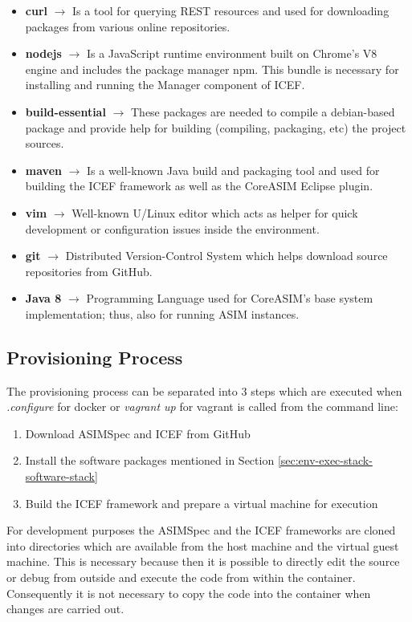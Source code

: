 \begin{itemize}
	\item \textbf{curl} $\rightarrow$ Is a tool for querying REST resources and used for downloading packages from various online repositories.
	\item \textbf{nodejs} $\rightarrow$ Is a JavaScript runtime environment built on Chrome's V8 engine and includes the package manager npm. This bundle is necessary for installing and running the Manager component of ICEF.
	\item \textbf{build-essential} $\rightarrow$ These packages are needed to compile a debian-based package and provide help for building (compiling, packaging, etc) the project sources.
	\item \textbf{maven} $\rightarrow$ Is a well-known Java build and packaging tool and used for building the ICEF framework as well as the CoreASIM Eclipse plugin.
	\item \textbf{vim} $\rightarrow$ Well-known U/Linux editor which acts as helper for quick development or configuration issues inside the environment.
	\item \textbf{git} $\rightarrow$ Distributed Version-Control System which helps download source repositories from GitHub.
	\item \textbf{Java 8} $\rightarrow$ Programming Language used for CoreASIM's base system implementation; thus, also for running ASIM instances.
\end{itemize}

\subsection{Provisioning Process}

The provisioning process can be separated into 3 steps which are executed when \textit{.\/configure} for docker or \textit{vagrant up} for vagrant is called from the command line:

\begin{enumerate}
	\item Download ASIMSpec and ICEF from GitHub
	\item Install the software packages mentioned in Section \ref{sec:env-exec-stack-software-stack}
	\item Build the ICEF framework and prepare a virtual machine for execution
\end{enumerate}

For development purposes the ASIMSpec and the ICEF frameworks are cloned into directories which are available from the host machine and the virtual guest machine. This is necessary because then it is possible to directly edit the source or debug from outside and execute the code from within the container. Consequently it is not necessary to copy the code into the container when changes are carried out.


